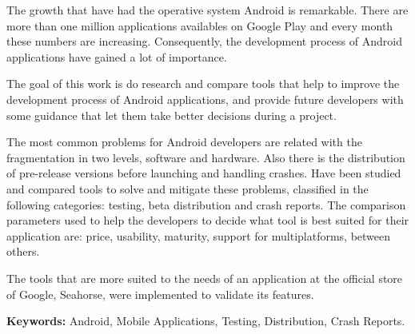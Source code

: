 
The growth that have had the operative system Android is remarkable. There are more than one million applications availables on Google Play and every month these numbers are increasing. Consequently, the development process of Android applications have gained a lot of importance.

The goal of this work is do research and compare tools that help to improve the development process of Android applications, and provide future developers with some guidance that let them take better decisions during a project.

The most common problems for Android developers are related with the fragmentation in two levels, software and hardware. Also there is the distribution of pre-release versions before launching and handling crashes. Have been studied and compared tools to solve and mitigate these problems, classified in the following categories: testing, beta distribution and crash reports. The comparison parameters used to help the developers to decide what tool is best suited for their application are: price, usability, maturity, support for multiplatforms, between others.

The tools that are more suited to the needs of an application at the official store of Google, Seahorse, were implemented to validate its features.

\textbf{Keywords:} Android, Mobile Applications, Testing, Distribution, Crash Reports.
